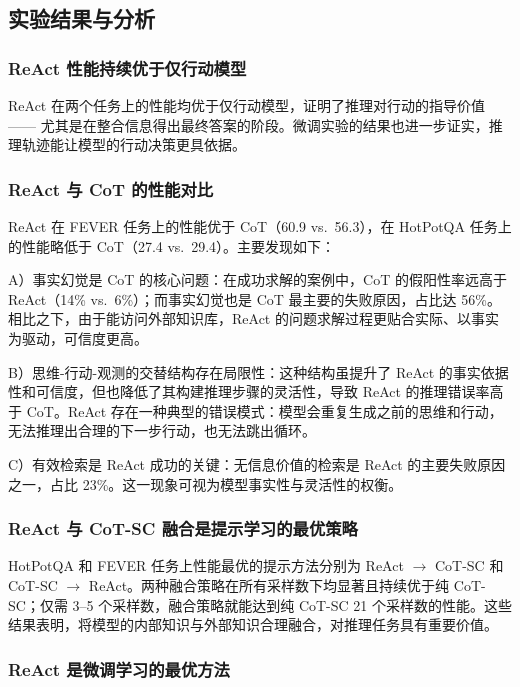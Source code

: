 \subsection{实验结果与分析}

\subsubsection*{ReAct 性能持续优于仅行动模型}

ReAct 在两个任务上的性能均优于仅行动模型，证明了推理对行动的指导价值 —— 尤其是在整合信息得出最终答案的阶段。微调实验的结果也进一步证实，推理轨迹能让模型的行动决策更具依据。

\subsubsection*{ReAct 与 CoT 的性能对比}

ReAct 在 FEVER 任务上的性能优于 CoT（60.9 vs.\ 56.3），在 HotPotQA 任务上的性能略低于 CoT（27.4 vs.\ 29.4）。主要发现如下：

A）事实幻觉是 CoT 的核心问题：在成功求解的案例中，CoT 的假阳性率远高于 ReAct（14\% vs.\ 6\%）；而事实幻觉也是 CoT 最主要的失败原因，占比达 56\%。相比之下，由于能访问外部知识库，ReAct 的问题求解过程更贴合实际、以事实为驱动，可信度更高。

B）思维-行动-观测的交替结构存在局限性：这种结构虽提升了 ReAct 的事实依据性和可信度，但也降低了其构建推理步骤的灵活性，导致 ReAct 的推理错误率高于 CoT。ReAct 存在一种典型的错误模式：模型会重复生成之前的思维和行动，无法推理出合理的下一步行动，也无法跳出循环。

C）有效检索是 ReAct 成功的关键：无信息价值的检索是 ReAct 的主要失败原因之一，占比 23\%。这一现象可视为模型事实性与灵活性的权衡。

\subsubsection*{ReAct 与 CoT-SC 融合是提示学习的最优策略}

HotPotQA 和 FEVER 任务上性能最优的提示方法分别为 ReAct $\to$ CoT-SC 和 CoT-SC $\to$ ReAct。两种融合策略在所有采样数下均显著且持续优于纯 CoT-SC；仅需 3--5 个采样数，融合策略就能达到纯 CoT-SC 21 个采样数的性能。这些结果表明，将模型的内部知识与外部知识合理融合，对推理任务具有重要价值。

\subsubsection*{ReAct 是微调学习的最优方法}

